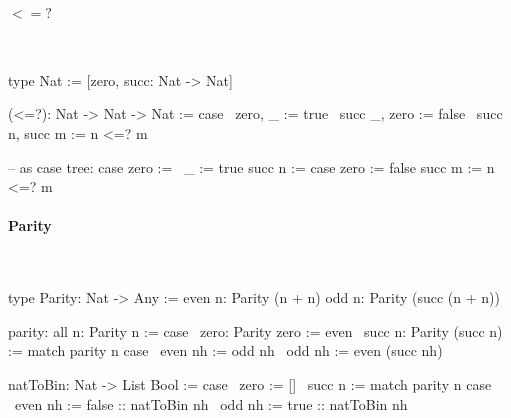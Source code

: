 \paragraph{$<=?$}
\ \begin{alba}
    type Nat := [zero, succ: Nat -> Nat]

    (<=?): Nat -> Nat -> Nat := case
        \ zero,   _      :=  true
        \ succ _, zero   :=  false
        \ succ n, succ m :=  n <=? m

    -- as case tree:
    case
        zero           :=   \ _ := true
        succ n :=
            case
                zero   :=   false
                succ m :=   n <=? m
\end{alba}


\paragraph{Parity}
\ \begin{alba}
    type Parity: Nat -> Any :=
        even n: Parity (n + n)
        odd  n: Parity (succ (n + n))

    parity: all n: Parity n := case
        \ zero: Parity zero :=
            even
        \ succ n: Parity (succ n) :=
            match parity n case
                \ even nh :=
                    odd nh
                \ odd nh :=
                    even (succ nh)

    natToBin: Nat -> List Bool := case
        \ zero :=
            []
        \ succ n :=
            match parity n case
                \ even nh :=
                    false :: natToBin nh
                \ odd nh :=
                    true :: natToBin nh
\end{alba}
